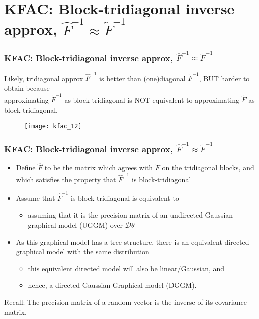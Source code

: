 \section{KFAC: Block-tridiagonal inverse approx, $\hat{F}^{-1} \approx \tilde{F}^{-1}$}

\begin{frame}
\frametitle{KFAC: Block-tridiagonal inverse approx, $\hat{F}^{-1} \approx \tilde{F}^{-1}$}
Likely, tridiagonal approx $\hat{F}^{-1}$ is better than (one)diagonal $\breve{F}^{-1}$,
BUT harder to obtain because\\
approximating $\tilde{F}^{-1}$ as block-tridiagonal is NOT equivalent to approximating $\tilde{F}$ as block-tridiagonal.

\begin{figure}
    \centering
    \texttt{[image: kfac\_12]}
\end{figure}

\end{frame}

\begin{frame}
\frametitle{KFAC: Block-tridiagonal inverse approx, $\hat{F}^{-1} \approx \tilde{F}^{-1}$}
\begin{itemize}
    \item Define $\hat{F}$ to be the matrix which agrees with $\tilde{F}$ on the tridiagonal blocks, and
        which satisfies the property that $\hat{F}^{-1}$ is block-tridiagonal
    \item Assume that $\hat{F}^{-1}$ is block-tridiagonal is equivalent to
        \begin{itemize}
        \item assuming that it is the precision matrix of an undirected Gaussian graphical model (UGGM) over $\mathcal{D}\theta$
        \end{itemize}
    \item As this graphical model has a tree structure, there is an equivalent
        directed graphical model with the same distribution
        \begin{itemize}
        \item this equivalent directed model will also be linear/Gaussian, and
        \item hence, a directed Gaussian Graphical model (DGGM).
        \end{itemize}
\end{itemize}

{\footnotesize
Recall: The precision matrix of a random vector is the inverse of its covariance matrix.
}
\end{frame}

